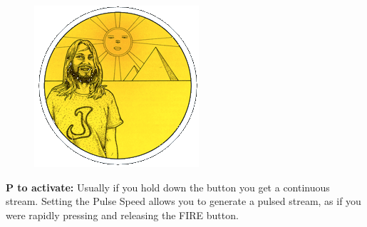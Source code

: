 \begin{definition}
\setlength{\intextsep}{0pt}%
\setlength{\columnsep}{3pt}%
\begin{figure}
\includegraphics[width=\linewidth]{src/callout/psych.png} 
\end{figure}
\small
\textbf{P to activate:} Usually if you hold down the button
you get a continuous stream. Setting the Pulse Speed allows you to
generate a pulsed stream, as if you were rapidly pressing and
releasing the FIRE button.
\\
\end{definition}


